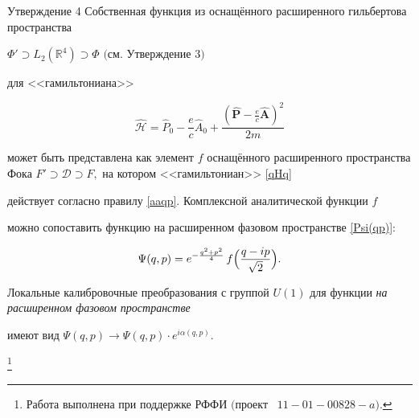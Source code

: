 \begin{newthm}{Утверждение 4} Собственная функция из оснащённого расширенного гильбертова пространства

$\Phi'\supset L_2(\mathbb{R}^4)\supset\Phi$ $($см{\rm .} Утверждение $3)$

для <<гамильтониана>>

$$

\mathcal{\hat H}=\hat P_0-\frac{e}{c}\hat A_0+\frac{(\mathbf{\hat P}-\frac{e}{c}\mathbf{\hat A})^2}{2m}

$$

 может быть представлена как элемент $f$ оснащённого расширенного пространства Фока $F'\supset \mathcal{D}\supset F,$ на котором <<гамильтониан>> \eqref{qHq}

действует согласно правилу \eqref{aaqp}{\rm .} Комплексной аналитической функции $f$ 


можно сопоставить функцию на расширенном фазовом пространстве \eqref{Psi(qp)}{\rm :}

$$\Psi(q,p)=e^{-\frac{q^2+p^2}4}\,f\Bigl(\frac{{q}-i{p}}{\sqrt2}\Bigr).$$ 



Локальные калибровочные преобразования с группой $U(1)$ для функции \emph{на расширенном фазовом пространстве} 

имеют вид $\Psi(q,p)\to\Psi(q,p)\cdot e^{i\alpha(q,p)}.$


\end{newthm}



{\thanks{Работа выполнена при поддержке РФФИ $($проект \rm \No~$11{-}01{-}00828{-}a).$}}






